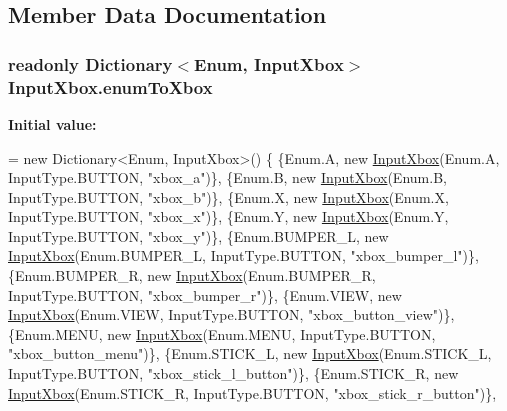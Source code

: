 \subsection{Member Data Documentation}
\hypertarget{class_input_xbox_a93501ed6fd82c26d5b6f69c481727967}{
\subsubsection[{enum\-To\-Xbox}]{\setlength{\rightskip}{0pt plus 5cm}readonly Dictionary$<$Enum, {\bf Input\-Xbox}$>$ Input\-Xbox.\-enum\-To\-Xbox\hspace{0.3cm}{\ttfamily [static]}}}\label{class_input_xbox_a93501ed6fd82c26d5b6f69c481727967}
{\bfseries Initial value\-:}
\begin{DoxyCode}
= \textcolor{keyword}{new} Dictionary<Enum, InputXbox>()
    \{
        \{Enum.A, \textcolor{keyword}{new} \hyperlink{class_input_xbox}{InputXbox}(Enum.A, InputType.BUTTON, \textcolor{stringliteral}{"xbox\_a"})\},
        \{Enum.B, \textcolor{keyword}{new} \hyperlink{class_input_xbox}{InputXbox}(Enum.B, InputType.BUTTON, \textcolor{stringliteral}{"xbox\_b"})\},
        \{Enum.X, \textcolor{keyword}{new} \hyperlink{class_input_xbox}{InputXbox}(Enum.X, InputType.BUTTON, \textcolor{stringliteral}{"xbox\_x"})\},
        \{Enum.Y, \textcolor{keyword}{new} \hyperlink{class_input_xbox}{InputXbox}(Enum.Y, InputType.BUTTON, \textcolor{stringliteral}{"xbox\_y"})\},
        \{Enum.BUMPER\_L, \textcolor{keyword}{new} \hyperlink{class_input_xbox}{InputXbox}(Enum.BUMPER\_L, InputType.BUTTON, \textcolor{stringliteral}{"xbox\_bumper\_l"})\},
        \{Enum.BUMPER\_R, \textcolor{keyword}{new} \hyperlink{class_input_xbox}{InputXbox}(Enum.BUMPER\_R, InputType.BUTTON, \textcolor{stringliteral}{"xbox\_bumper\_r"})\},
        \{Enum.VIEW, \textcolor{keyword}{new} \hyperlink{class_input_xbox}{InputXbox}(Enum.VIEW, InputType.BUTTON, \textcolor{stringliteral}{"xbox\_button\_view"})\},
        \{Enum.MENU, \textcolor{keyword}{new} \hyperlink{class_input_xbox}{InputXbox}(Enum.MENU, InputType.BUTTON, \textcolor{stringliteral}{"xbox\_button\_menu"})\},
        \{Enum.STICK\_L, \textcolor{keyword}{new} \hyperlink{class_input_xbox}{InputXbox}(Enum.STICK\_L, InputType.BUTTON, \textcolor{stringliteral}{"xbox\_stick\_l\_button"})\},
        \{Enum.STICK\_R, \textcolor{keyword}{new} \hyperlink{class_input_xbox}{InputXbox}(Enum.STICK\_R, InputType.BUTTON, \textcolor{stringliteral}{"xbox\_stick\_r\_button"})\},

\end{DoxyCode}
